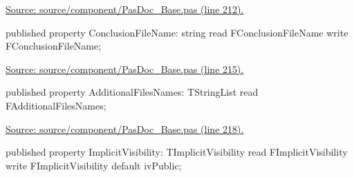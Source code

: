 \documentclass{report}
\newif\ifpdf
\begin{document}
\begin{list}{}
\begin{flushleft}
\ifpdf
\end{flushleft}
\fi


\par  \par
\href{https://github.com/pasdoc/pasdoc/blob/master/source/component/PasDoc_Base.pas#L212}{Source: source/component/PasDoc{\_}Base.pas (line 212).}\label{PasDoc_Base.TPasDoc-ConclusionFileName}
\item[\textbf{ConclusionFileName}\hfill]
\ifpdf
\begin{flushleft}
\fi
\begin{ttfamily}
published property ConclusionFileName: string read FConclusionFileName
      write FConclusionFileName;\end{ttfamily}

\ifpdf
\end{flushleft}
\fi


\par  \par
\href{https://github.com/pasdoc/pasdoc/blob/master/source/component/PasDoc_Base.pas#L215}{Source: source/component/PasDoc{\_}Base.pas (line 215).}\label{PasDoc_Base.TPasDoc-AdditionalFilesNames}
\item[\textbf{AdditionalFilesNames}\hfill]
\ifpdf
\begin{flushleft}
\fi
\begin{ttfamily}
published property AdditionalFilesNames: TStringList read FAdditionalFilesNames;\end{ttfamily}

\ifpdf
\end{flushleft}
\fi


\par  \par
\href{https://github.com/pasdoc/pasdoc/blob/master/source/component/PasDoc_Base.pas#L218}{Source: source/component/PasDoc{\_}Base.pas (line 218).}\label{PasDoc_Base.TPasDoc-ImplicitVisibility}
\item[\textbf{ImplicitVisibility}\hfill]
\ifpdf
\begin{flushleft}
\fi
\begin{ttfamily}
published property ImplicitVisibility: TImplicitVisibility
      read FImplicitVisibility write FImplicitVisibility default ivPublic;\end{ttfamily}

\ifpdf
\end{flushleft}
\fi



\end{list}
\end{document}
